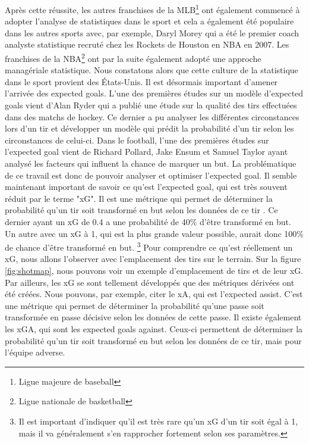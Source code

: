 \documentclass[12pt]{article}
\begin{document}
\newline
Après cette réussite, les autres franchises de la MLB\footnote{Ligue majeure de baseball} ont également commencé à adopter l'analyse de statistiques dans le sport et cela a également été populaire dans les autres sports avec, par exemple, Daryl Morey qui a été le premier coach analyste statistique recruté chez les Rockets de Houston en NBA en 2007. \cite{DarylMorey13year2020}
Les franchises de la NBA\footnote{Ligue nationale de basketball} ont par la suite également adopté une approche managériale statistique.
Nous constatons alors que cette culture de la statistique dans le sport provient des États-Unis.
\newline
Il est désormais important d'amener l'arrivée des expected goals.
L'une des premières études sur un modèle d'expected goals vient d'Alan Ryder qui a publié une étude sur la qualité des tirs effectuées dans des matchs de hockey. \cite{ryderIsolatingShotQuality2004}
Ce dernier a pu analyser les différentes circonstances lors d'un tir et développer un modèle qui prédit la probabilité d'un tir selon les circonstances de celui-ci.
Dans le football, l'une des premières études sur l'expected goal vient de Richard Pollard, Jake Ensum et Samuel Taylor ayant analysé les facteurs qui influent la chance de marquer un but. \cite{pollardEstimatingProbabilityShot2004} La problématique de ce travail est donc de pouvoir analyser et optimiser l'expected goal.
\newline\newline
Il semble maintenant important de savoir ce qu'est l'expected goal, qui est très souvent réduit par le terme "xG".
Il est une métrique qui permet de déterminer la probabilité qu'un tir soit transformé en but selon les données de ce tir \cite{XGExplainedFBrefa}.
Ce dernier ayant un xG de 0.4 a une probabilité de 40\% d'être transformé en but. Un autre avec un xG à 1, qui est la plus grande valeur possible, aurait donc 100\% de chance d'être transformé en but.
\footnote{Il est important d'indiquer qu'il est très rare qu'un xG d'un tir soit égal à 1, mais il va généralement s'en rapprocher fortement selon ses paramètres.} \cite{pettyWhatExpectedGoals2018a}
\newline\newline
Pour comprendre ce qu'est réellement un xG, nous allons l'observer avec l'emplacement des tirs sur le terrain.
Sur la figure \ref{fig:shotmap}, nous pouvons voir un exemple d'emplacement de tirs et de leur xG.
\newline \newline
Par ailleurs, les xG se sont tellement développés que des métriques dérivées ont été créées.
Nous pouvons, par exemple, citer le xA, qui est l'expected assist.
C'est une métrique qui permet de déterminer la probabilité qu'une passe soit transformée en passe décisive selon les données de cette passe. \cite{XGExplainedFBrefa}
Il existe également les xGA, qui sont les expected goals against.
Ceux-ci permettent de déterminer la probabilité qu'un tir soit transformé en but selon les données de ce tir, mais pour l'équipe adverse. \cite{pettyWhatExpectedGoals2018a}
\end{document}
